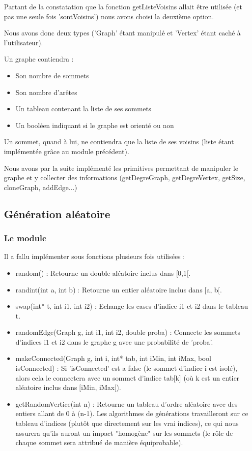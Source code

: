 \documentclass[a4paper,10pt]{article}
\newcommand*{\itemb}{\item[$\bullet$]}
\begin{document}
Partant de la constatation que la fonction getListeVoisins allait être utilisée (et pas une seule fois 'sontVoisins') nous avons choisi la deuxième option.

Nous avons donc deux types ('Graph' étant manipulé et 'Vertex' étant caché à l'utilisateur).

Un graphe contiendra :
\begin{itemize}
\itemb Son nombre de sommets
\itemb Son nombre d'arêtes
\itemb Un tableau contenant la liste de ses sommets
\itemb Un booléen indiquant si le graphe est orienté ou non
\end{itemize}

Un sommet, quand à lui, ne contiendra que la liste de ses voisins (liste étant implémentée grâce au module précédent).

Nous avons par la suite implémenté les primitives permettant de manipuler le graphe et y collecter des informations (getDegreGraph, getDegreVertex, getSize, cloneGraph, addEdge...)

\subsection{Génération aléatoire}

\subsubsection{Le module}

Il a fallu implémenter sous fonctions plusieurs fois utilisées :
\begin{itemize}
\itemb random() : Retourne un double aléatoire inclus dans [0,1[.
\itemb randint(int a, int b) : Retourne un entier aléatoire inclus dans [a, b[.
\itemb swap(int* t, int i1, int i2) : Echange les cases d'indice i1 et i2 dans le tableau t.
\itemb randomEdge(Graph g, int i1, int i2, double proba) : Connecte les sommets d'indices i1 et i2 dans le graphe g avec une probabilité de 'proba'.
\itemb makeConnected(Graph g, int i, int* tab, int iMin, int iMax, bool isConnected) : Si 'isConnected' est a false (le sommet d'indice i est isolé), alors cela le connectera avec un sommet d'indice tab[k] (où k est un entier aléatoire inclus dans [iMin, iMax[).
\itemb getRandomVertice(int n) : Retourne un tableau d'ordre aléatoire avec des entiers allant de 0 à (n-1). Les algorithmes de générations travailleront sur ce tableau d'indices (plutôt que directement sur les vrai indices), ce qui nous assurera qu'ils auront un impact "homogène" sur les sommets (le rôle de chaque sommet sera attribué de manière équiprobable).
\end{itemize}
\end{document}
